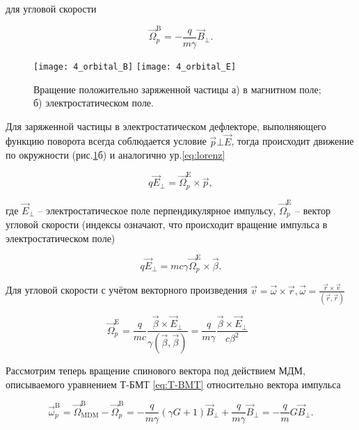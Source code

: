\noindent для угловой скорости

\begin{equation} \label{eq:omega_pB}
 {\vec{\Omega}}_p^{\textrm{B}}=-\frac{q}{m\gamma}{\vec{B}}_\bot.
\end{equation} 

\begin{figure}[!h]
  \centering
	\texttt{[image: 4\_orbital\_B]}
	\texttt{[image: 4\_orbital\_E]}
   \caption{Вращение положительно заряженной частицы а) в магнитном поле; б) электростатическом поле.}
   \label{fig:4_orbital_B_E}
\end{figure}

\par Для заряженной частицы в электростатическом дефлекторе, выполняющего функцию поворота всегда соблюдается условие $\vec{p} \bot \vec{E}$, тогда происходит движение по окружности (рис.\ref{fig:4_orbital_B_E}б) и аналогично ур.\ref{eq:lorenz}

\begin{equation}
q{\vec{E}}_\bot={\vec{\Omega}}_p^{\textrm{E}}\times\vec{p},
\end{equation} 

\noindent где ${\vec{E}}_\bot$ – электростатическое поле перпендикулярное импульсу, ${\vec{\Omega}}_p^{\textrm{E}}$ – вектор угловой скорости (индексы означают, что происходит вращение импульса в электростатическом поле)

\begin{equation}
q{\vec{E}}_\bot=mc\gamma{\vec{\Omega}}_p^{\textrm{E}}\times\vec{\beta}.
\end{equation} 

\noindent Для угловой скорости с учётом векторного произведения $\vec{v}=\vec{\omega}\times\vec{r}, \vec{\omega}=\frac{\vec{r}\times\vec{v}}{(\vec{r},\vec{r})}$

\begin{equation}
{\vec{\Omega}}_p^{\textrm{E}}=\frac{q}{mc}\frac{\vec{\beta}\times{\vec{E}}_\bot}{\gamma(\vec{\beta},\vec{\beta})}=\frac{q}{m\gamma}\frac{\vec{\beta}\times{\vec{E}}_\bot}{c\beta^2}\ \ \ 
\label{eq:orbital_E}
\end{equation}

\par Рассмотрим теперь вращение спинового вектора под действием МДМ, описываемого уравнением Т-БМТ \ref{eq:T-BMT} относительно вектора импульса

\begin{equation}
{\vec{\omega}}_p^{\textrm{B}}={\vec{\Omega}}_{\textrm{MDM}}^\textrm{B}-{\vec{\Omega}}_p^{\textrm{B}}=-\frac{q}{m\gamma}\left(\gamma G+1\right){\vec{B}}_\bot+\frac{q}{m\gamma}{\vec{B}}_\bot=-\frac{q}{m}{G\vec{B}}_\bot.
\end{equation}

